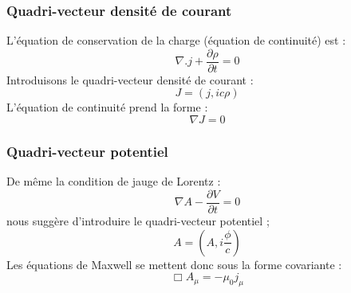 \documentclass[12pt]{book}
\begin{document}
\subsubsection{Quadri-vecteur densit\'e de courant}
L'\'equation de conservation de la charge (\'equation de continuit\'e)
est : 
\begin{equation}
\nabla.j+\frac{\partial \rho}{\partial t}=0
\end{equation}
Introduisons le quadri-vecteur densit\'e de courant :
\begin{equation}
J=(j,ic\rho)
\end{equation}
L'\'equation de continuit\'e prend la forme :
\begin{equation}
\nabla J=0
\end{equation}
\subsubsection{Quadri-vecteur potentiel }
De m\^eme la condition de jauge de Lorentz :
\begin{equation}
\nabla A-\frac{\partial V}{\partial t}=0
\end{equation}
nous sugg\`ere d'introduire le quadri-vecteur potentiel ;
\begin{equation}
A=(A,i\frac{\phi}{c})
\end{equation}
Les \'equations de Maxwell se mettent donc sous la forme covariante :
\begin{equation}
\Box A_\mu=-\mu_0j_\mu
\end{equation}
\end{document}
